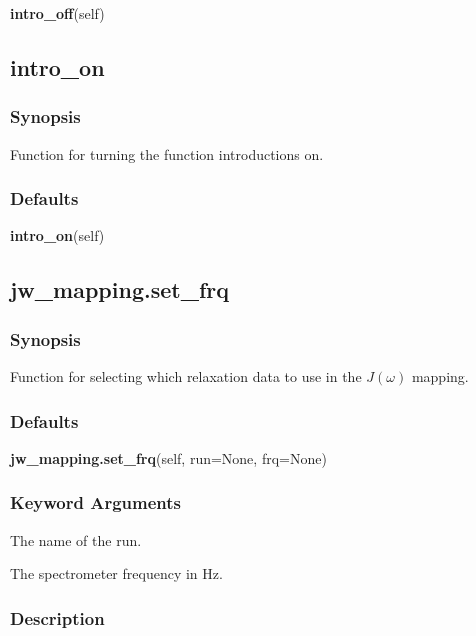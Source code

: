 \textsf{\textbf{intro\_off}(self)}



\newpage

\subsection{intro\_on}


\subsubsection{Synopsis}

Function for turning the function introductions on.

\subsubsection{Defaults}

\textsf{\textbf{intro\_on}(self)}



\newpage

\subsection{jw\_mapping.set\_frq}


\subsubsection{Synopsis}

Function for selecting which relaxation data to use in the $J(\omega)$ mapping.

\subsubsection{Defaults}

\textsf{\textbf{jw\_mapping.set\_frq}(self, run=None, frq=None)}


\subsubsection{Keyword Arguments}


  The name of the run.

  The spectrometer frequency in Hz.

\subsubsection{Description}

